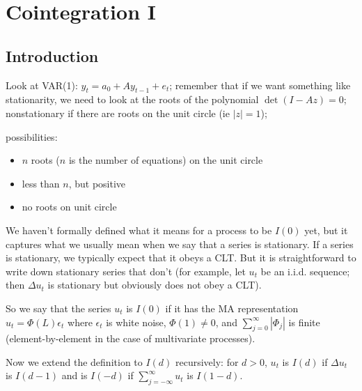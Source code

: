 

\section{Cointegration I}

\subsection{Introduction}

Look at VAR(1): $y_t = a_0 + A y_{t-1} + e_t$; remember that if we
want something like stationarity, we need to look at the roots of the
polynomial $\det(I - A z) = 0$; nonstationary if there are roots on
the unit circle (ie $|z| = 1$);

possibilities:
\begin{itemize}
\item $n$ roots ($n$ is the number of equations) on the unit circle
\item less than $n$, but positive
\item no roots on unit circle
\end{itemize}

We haven't formally defined what it means for a process to be $I(0)$
yet, but it captures what we usually mean when we say that a series is
stationary.  If a series is stationary, we typically expect that it
obeys a CLT.  But it is straightforward to write down stationary
series that don't (for example, let $u_t$ be an i.i.d. sequence; then
$\Delta u_t$ is stationary but obviously does not obey a CLT).

So we say that the series $u_t$ is $I(0)$ if it has the MA
representation $u_t = \Phi(L) \epsilon_t$ where $\epsilon_t$ is white noise, $\Phi(1) \neq
0$, and $\sum_{j=0}^\infty | \Phi_j |$ is finite (element-by-element in the case
of multivariate processes).

Now we extend the definition to $I(d)$ recursively: for $d > 0$, $u_t$
is $I(d)$ if $\Delta u_t$ is $I(d-1)$ and is $I(-d)$ if $\sum_{j=-\infty}^\infty u_t$ is
$I(1-d)$.

